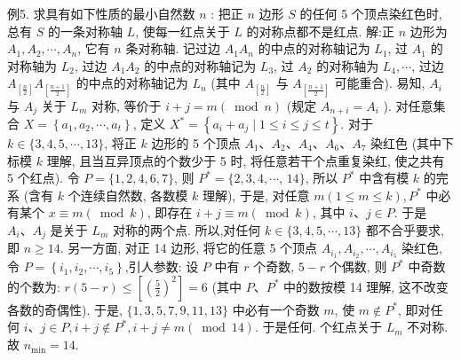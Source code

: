 例5. 求具有如下性质的最小自然数 $n$ : 把正 $n$ 边形 $S$ 的任何 5 个顶点染红色时, 总有 $S$ 的一条对称轴 $L$, 使每一红点关于 $L$ 的对称点都不是红点.
解:正 $n$ 边形为 $A_1, A_2, \cdots, A_n$, 它有 $n$ 条对称轴.
记过边 $A_1 A_n$ 的中点的对称轴记为 $L_1$, 过 $A_1$ 的对称轴为 $L_2$, 过边 $A_1 A_2$ 的中点的对称轴记为 $L_3$, 过 $A_2$ 的对称轴为 $L_4, \cdots$, 过边 $A_{\left[\frac{n}{2}\right]} A_{\left[\frac{n+1}{2}\right]}$ 的中点的对称轴记为 $L_n$ (其中 $A_{\left[\frac{n}{2}\right]}$ 与 $A_{\left[\frac{n+1}{2}\right]}$ 可能重合). 易知, $A_i$ 与 $A_j$ 关于 $L_m$ 对称, 等价于 $i+j=m(\bmod n)$ (规定 $A_{n+i}=A_i$ ).
对任意集合 $X=\left\{a_1, a_2, \cdots, a_t\right\}$, 定义 $X^*=\left\{a_i+a_j \mid 1 \leqslant i \leqslant j \leqslant t\right\}$. 对于 $k \in\{3,4,5, \cdots, 13\}$, 将正 $k$ 边形的 5 个顶点 $A_1 、 A_2 、 A_4 、 A_6 、 A_7$ 染红色 (其中下标模 $k$ 理解, 且当互异顶点的个数少于 5 时, 将任意若干个点重复染红, 使之共有 5 个红点). 令 $P=\{1,2,4,6,7\}$, 则 $P^*=\{2,3,4, \cdots$, $14\}$, 所以 $P^*$ 中含有模 $k$ 的完系 (含有 $k$ 个连续自然数, 各数模 $k$ 理解), 于是, 对任意 $m(1 \leqslant m \leqslant k), P^*$ 中必有某个 $x \equiv m(\bmod k)$, 即存在 $i+j \equiv m(\bmod k)$, 其中 $i 、 j \in P$. 于是 $A_i 、 A_j$ 是关于 $L_m$ 对称的两个点.
所以,对任何
$k \in\{3,4,5, \cdots, 13\}$ 都不合乎要求,即 $n \geqslant 14$.
另一方面, 对正 14 边形, 将它的任意 5 个顶点 $A_{i_1}, A_{i_2}, \cdots, A_{i_5}$ 染红色, 令 $P=\left\{i_1, i_2, \cdots, i_5\right\}$,引人参数: 设 $P$ 中有 $r$ 个奇数, $5-r$ 个偶数, 则 $P^*$ 中奇数的个数为: $r(5-r) \leqslant\left[\left(\frac{5}{2}\right)^2\right]=6$ (其中 $P 、 P^*$ 中的数按模 14 理解, 这不改变各数的奇偶性). 于是, $\{1,3,5,7,9,11,13\}$ 中必有一个奇数 $m$, 使 $m \notin P^*$, 即对任何 $i 、 j \in P, i+j \notin P^*, i+j \neq m(\bmod 14)$. 于是任何.
个红点关于 $L_m$ 不对称.
故 $n_{\min }=14$.




